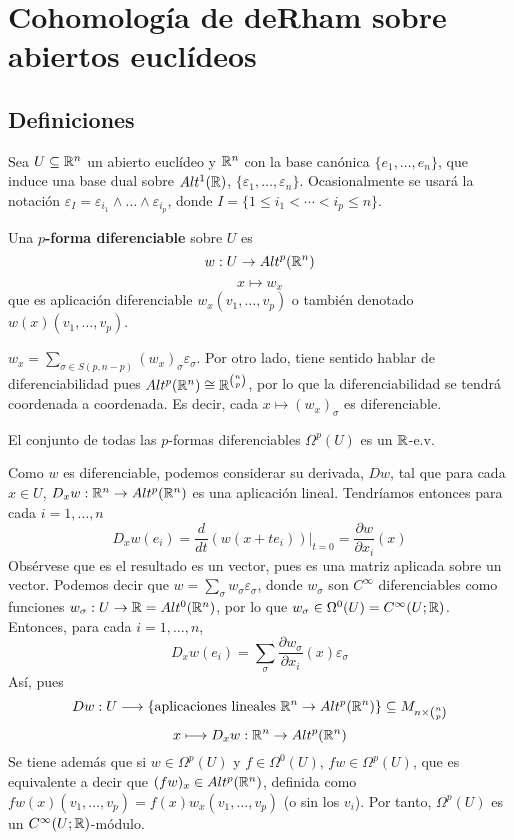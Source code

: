 \documentclass[CV.tex]{subfiles}
\begin{document}

\chapter{Cohomología de deRham sobre abiertos euclídeos}
\section{Definiciones}
Sea $U\subseteq\mathbb{R}^n$ un abierto euclídeo y $\mathbb{R}^n$ con la base canónica $\{e_1,\dots, e_n\}$, que induce una base dual sobre $Alt^1(\mathbb{R})$, $\{\varepsilon_1,\dots, \varepsilon_n\}$. Ocasionalmente se usará la notación $\varepsilon_I=\varepsilon_{i_1}\land\dots\land\varepsilon_{i_p}$, donde $I=\{1\leq i_1<\cdots<i_p\leq n\}$.

\begin{defi}
Una \textbf{$p$-forma diferenciable} sobre $U$ es 
\[
w:U\to Alt^p(\mathbb{R}^n)
\]
\[
x\mapsto w_x
\]
que es aplicación diferenciable $w_x(v_1,\dots, v_p)$ o también denotado $w(x)(v_1,\dots, v_p)$. 
\end{defi}

\begin{observaciones}
$w_x=\sum_{\sigma\in S(p,n-p)}(w_x)_{\sigma}\varepsilon_{\sigma}$. Por otro lado, tiene sentido hablar de diferenciabilidad pues $Alt^p(\mathbb{R}^n)\cong \mathbb{R}^{\binom{n}{p}}$, por lo que la diferenciabilidad se tendrá coordenada a coordenada. Es decir, cada $x\mapsto (w_x)_{\sigma}$ es diferenciable. 
\end{observaciones}

\begin{lemma}
El conjunto de todas las $p$-formas diferenciables $\Omega^p(U)$ es un $\mathbb{R}$-e.v.
\end{lemma}

Como $w$ es diferenciable, podemos considerar su derivada, $Dw$, tal que para cada $x\in U$, $D_xw:\mathbb{R}^n\to Alt^p(\mathbb{R}^n)$ es una aplicación lineal. Tendríamos entonces para cada $i=1,\dots, n$
\[
D_xw(e_i)=\frac{d}{dt}(w(x+te_i))|_{t=0}=\frac{\partial w}{\partial x_i}(x)
\]
Obsérvese que es el resultado es un vector, pues es una matriz aplicada sobre un vector. Podemos decir que $w=\sum_{\sigma}w_{\sigma}\varepsilon_{\sigma}$, donde $w_{\sigma}$ son $C^{\infty}$ diferenciables como funciones $w_{\sigma}: U\to \mathbb{R}=Alt^0(\mathbb{R}^n)$, por lo que $w_{\sigma}\in\Omega^0(U)=C^{\infty}(U;\mathbb{R})$. Entonces, para cada $i=1,\dots, n$,
\[
D_xw(e_i)=\sum_{\sigma}\frac{\partial w_{\sigma}}{\partial x_i}(x)\varepsilon_{\sigma}
\]
\newpage
Así, pues
\[
Dw: U\longrightarrow \{\text{aplicaciones lineales } \mathbb{R}^n\to Alt^p(\mathbb{R}^n)\}\subseteq M_{n\times\binom{n}{p}}
\]
\[x\longmapsto D_xw:\mathbb{R}^n\to Alt^p(\mathbb{R}^n)
\]
Se tiene además que si $w\in\Omega^p(U)$ y $f\in\Omega^0(U)$, $fw\in\Omega^p(U)$, que es equivalente a decir que $(fw)_x\in Alt^p(\mathbb{R}^n)$, definida como $fw(x)(v_1,\dots, v_p)=f(x)w_x(v_1,\dots, v_p)$ (o sin los $v_i$). Por tanto, $\Omega^p(U)$ es un $C^{\infty}(U;\mathbb{R})$-módulo. 
\end{document}
